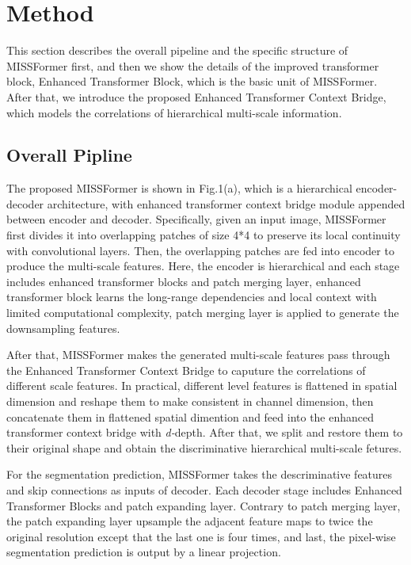 \documentclass[letterpaper]{article} \usepackage{aaai22}  \usepackage{times}  \usepackage{helvet}  \usepackage{courier}  \usepackage[hyphens]{url}  \usepackage{graphicx} \urlstyle{rm} \def\UrlFont{\rm}  \usepackage{natbib}  \usepackage{caption} \DeclareCaptionStyle{ruled}{labelfont=normalfont,labelsep=colon,strut=off} \frenchspacing  \setlength{\pdfpagewidth}{8.5in}  \setlength{\pdfpageheight}{11in}  \usepackage{algorithm}
\begin{document}
\section{Method}
This section describes the overall pipeline and the specific structure of MISSFormer first, and then we show the details of the improved transformer block, Enhanced Transformer Block, which is the basic unit of MISSFormer. After that, we introduce the proposed Enhanced Transformer Context Bridge, which models the correlations of hierarchical multi-scale information.
\subsection{Overall Pipline}
The proposed MISSFormer is shown in Fig.1(a), which is a hierarchical encoder-decoder architecture, with enhanced transformer context bridge module appended between encoder and decoder. Specifically, given an input image, MISSFormer first divides it into overlapping patches of size 4*4 to preserve its local continuity with convolutional layers. Then, the overlapping patches are fed into encoder to produce the multi-scale features. Here, the encoder is hierarchical and each stage includes enhanced transformer blocks and patch merging layer, enhanced transformer block learns the long-range dependencies and local context with limited computational complexity, patch merging layer is applied to generate the downsampling features.

After that, MISSFormer makes the generated multi-scale features pass through the Enhanced Transformer Context Bridge to caputure the correlations of different scale features. In practical, different level features is flattened in spatial dimension and reshape them to make consistent in channel dimension, then concatenate them in flattened spatial dimention and feed into the enhanced transformer context bridge with \textit{d-}depth. After that, we split and restore them to their original shape and obtain the discriminative hierarchical multi-scale fetures. 

For the segmentation prediction, MISSFormer takes the descriminative features and skip connections as inputs of decoder. Each decoder stage includes Enhanced Transformer Blocks and patch expanding layer\cite{Cao2021}. Contrary to patch merging layer, the patch expanding layer upsample the adjacent feature maps to twice the original resolution except that the last one is four times, and last, the pixel-wise segmentation prediction is output by a linear projection.
\end{document}
